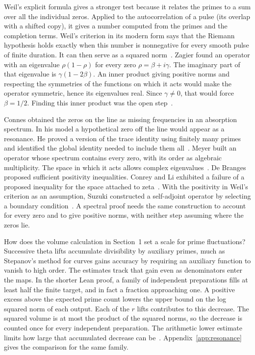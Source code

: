 \documentclass[11pt,letterpaper]{article}
\numberwithin{equation}{section}
\begin{document}
Weil's explicit formula gives a stronger test because it relates the primes to a
sum over all the individual zeros. Applied to the autocorrelation of a pulse (its
overlap with a shifted copy), it gives a number computed from the primes and the
completion terms. Weil's criterion in its modern form says that the Riemann
hypothesis holds exactly when this number is nonnegative for every smooth pulse of
finite duration. It can then serve as a squared
norm~\cite{weilcriterion,suzukiglobal}. Zagier found an operator with an eigenvalue
$\rho(1-\rho)$ for every zero $\rho=\beta+i\gamma$. The imaginary part of that
eigenvalue is $\gamma(1-2\beta)$. An inner product giving positive norms and
respecting the symmetries of the functions on which it acts would make the operator
symmetric, hence its eigenvalues real. Since $\gamma\ne0$, that would force
$\beta=1/2$. Finding this inner product was the open step~\cite{zagier}.

Connes obtained the zeros on the line as missing frequencies in an absorption
spectrum. In his model a hypothetical zero off the line would appear as a
resonance. He proved a version of the trace identity using finitely many primes and
identified the global identity needed to include them all~\cite{connes}. Meyer
built an operator whose spectrum contains every zero, with its order as algebraic
multiplicity. The space in which it acts allows complex
eigenvalues~\cite{meyerphysics}. De Branges proposed sufficient positivity
inequalities. Conrey and Li exhibited a failure of a proposed inequality for the
space attached to zeta~\cite{conreyli}. With the positivity in Weil's criterion as
an assumption, Suzuki constructed a self-adjoint operator by selecting a boundary
condition~\cite{suzukiglobal}. A spectral proof needs the same construction to
account for every zero and to give positive norms, with neither step assuming where
the zeros lie.

How does the volume calculation in Section~1 set a scale for prime fluctuations? Successive theta lifts accumulate divisibility by auxiliary primes, much as Stepanov's method for curves gains accuracy by requiring an auxiliary function to vanish to high order. The estimates track that gain even as denominators enter the maps. In the shorter Lean proof, a family of independent preparations fills at least half the finite target, and in fact a fraction approaching one. A positive excess above the expected prime count lowers the upper bound on the log squared norm of each output. Each of the $r$ lifts contributes to this decrease. The squared volume is at most the product of the squared norms, so the decrease is counted once for every independent preparation. The arithmetic lower estimate limits how large that accumulated decrease can be~\cite{volumelean}. Appendix~\ref{app:resonance} gives the comparison for the same family.
\end{document}
